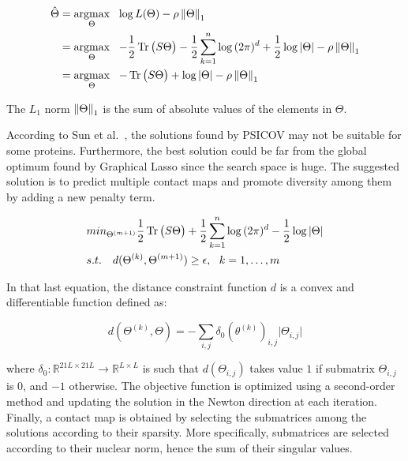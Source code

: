         \begin{equation}
            \begin{split}
                \hat{\Theta} & = \argmax_{\Theta} \ \ \log{L}(\Theta) - \rho \norm{\Theta}_1 \\
                & = \argmax_{\Theta} \ \ -\frac{1}{2} \trace\big(S \Theta\big) - \frac{1}{2} \sum\limits_{k=1}^{n} 
                    \log{(2\pi)^d} + \frac{1}{2} \log{\vert\Theta\vert} - \rho \norm{\Theta}_1 \\
                & = \argmax_{\Theta} \ \ -\trace\big(S \Theta\big) + \log{\vert\Theta\vert} - \rho \norm{\Theta}_1 \\
            \end{split}
        \end{equation}

        The $L_1$ norm $\left\lVert\Theta\right\rVert_1$ is the sum of absolute values of the elements in $\Theta$.
        \todo{}



        According to Sun et al.~\cite{doi:10.1093/nar/gky995}, the solutions found by PSICOV may not be suitable for some proteins.
        Furthermore, the best solution could be far from the global optimum found by Graphical Lasso since the search space is huge.
        The suggested solution is to predict multiple contact maps and promote diversity among them by adding a new penalty term.

        \begin{equation}\label{mbest}
            \begin{split}
                & min_{\Theta^{(m+1)}} \frac{1}{2} \operatorname{Tr}\big(S \Theta\big) + \frac{1}{2} 
                    \sum\limits_{k=1}^{n} \log{(2\pi)^d} - \frac{1}{2} \log{\vert\Theta\vert} \\
                & s.t. \ \ \ d(\Theta^{(k)}, \Theta^{(m+1)}) \ge \epsilon, \ \ k = 1, \dotsc, m
            \end{split}
        \end{equation}

        In that last equation, the distance constraint function $d$ is a convex and differentiable function defined as:

        \begin{equation}
            d(\Theta^{(k)}, \Theta) = - \sum\limits_{i, j} \delta_0(\theta^{(k)})_{i, j} \vert \Theta_{i, j} \vert
        \end{equation}

        where $\delta_0: \mathbb{R}^{21L \times 21L} \rightarrow \mathbb{R}^{L \times L}$ is such that 
        $d(\Theta_{i, j})$ takes value $1$ if submatrix $\Theta_{i, j}$ is $0$, and $-1$ otherwise.
        The objective function is optimized using a second-order method and updating the solution in the Newton direction at each iteration.
        Finally, a contact map is obtained by selecting the submatrices among the solutions according to their sparsity.
        More specifically, submatrices are selected according to their nuclear norm, hence the sum of their singular values.
